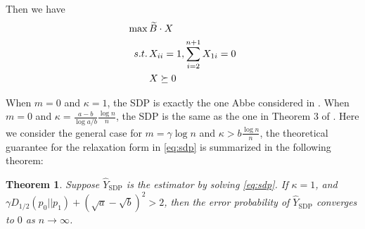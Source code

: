 \documentclass[conference]{IEEEtran}
\newtheorem{theorem}{Theorem}
\DeclareMathOperator{\SDP}{SDP}
\begin{document}
	Then we have
	\begin{align}
	\max\, & \widetilde{B} \cdot X \notag \\
	s.t.\,& X_{ii}=1, \sum_{i=2}^{n+1}X_{1i}=0 \notag \\
	& X \succeq 0 \label{eq:sdp}
	\end{align}
	
	When $m=0$ and $\kappa=1$,
	the SDP is exactly the one Abbe considered in \cite{abbe2015exact}.
	When $m=0$ and $\kappa=\frac{a-b}{\log a/b}\frac{\log n}{n}$, the SDP is
	the same as the one in Theorem 3 of \cite{Hajek16}. Here we consider the
	general case for $m=\gamma \log n$ and $\kappa > b\frac{\log n}{n}$,
	the theoretical guarantee for the relaxation form in \eqref{eq:sdp} is summarized
	in the following theorem:
	\begin{theorem}\label{thm:sdp}
		Suppose $\hat{Y}_{\SDP}$ is the estimator by solving \eqref{eq:sdp}.
		If $\kappa = 1$,
		and $\gamma D_{1/2}(p_0||p_1) + (\sqrt{a} - \sqrt{b})^2 > 2$,
		then the error probability of $\hat{Y}_{\SDP}$ converges to $0$ as $n\to \infty$.
	\end{theorem}
\end{document}
